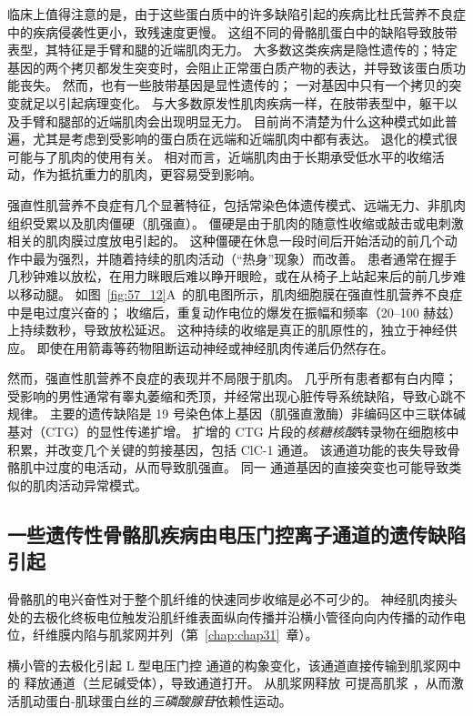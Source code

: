 临床上值得注意的是，由于这些蛋白质中的许多缺陷引起的疾病比杜氏营养不良症中的疾病侵袭性更小，致残速度更慢。
这组不同的骨骼肌蛋白中的缺陷导致肢带表型，其特征是手臂和腿的近端肌肉无力。
大多数这类疾病是隐性遗传的；特定基因的两个拷贝都发生突变时，会阻止正常蛋白质产物的表达，并导致该蛋白质功能丧失。
然而，也有一些肢带基因是显性遗传的；
一对基因中只有一个拷贝的突变就足以引起病理变化。
与大多数原发性肌肉疾病一样，在肢带表型中，躯干以及手臂和腿部的近端肌肉会出现明显无力。
目前尚不清楚为什么这种模式如此普遍，尤其是考虑到受影响的蛋白质在远端和近端肌肉中都有表达。
退化的模式很可能与了肌肉的使用有关。
相对而言，近端肌肉由于长期承受低水平的收缩活动，作为抵抗重力的肌肉，更容易受到影响。


强直性肌营养不良症有几个显著特征，包括常染色体遗传模式、远端无力、非肌肉组织受累以及肌肉僵硬（肌强直）。
僵硬是由于肌肉的随意性收缩或敲击或电刺激相关的肌肉膜过度放电引起的。
这种僵硬在休息一段时间后开始活动的前几个动作中最为强烈，并随着持续的肌肉活动（“热身”现象）而改善。
患者通常在握手几秒钟难以放松，在用力眯眼后难以睁开眼睑，或在从椅子上站起来后的前几步难以移动腿。
如图~\ref{fig:57_12}A~的肌电图所示，肌肉细胞膜在强直性肌营养不良症中是电过度兴奋的；
收缩后，重复动作电位的爆发在振幅和频率（20–100 赫兹）上持续数秒，导致放松延迟。
这种持续的收缩是真正的肌原性的，独立于神经供应。
即使在用箭毒等药物阻断运动神经或神经肌肉传递后仍然存在。


然而，强直性肌营养不良症的表现并不局限于肌肉。
几乎所有患者都有白内障；
受影响的男性通常有睾丸萎缩和秃顶，并经常出现心脏传导系统缺陷，导致心跳不规律。
主要的遗传缺陷是 19 号染色体上基因（肌强直激酶）非编码区中三联体碱基对（CTG）的显性传递扩增。
扩增的 CTG 片段的\textit{核糖核酸}转录物在细胞核中积累，并改变几个关键的剪接基因，包括 ClC-1  通道。
该通道功能的丧失导致骨骼肌中过度的电活动，从而导致肌强直。
同一  通道基因的直接突变也可能导致类似的肌肉活动异常模式。



\subsection{一些遗传性骨骼肌疾病由电压门控离子通道的遗传缺陷引起}

骨骼肌的电兴奋性对于整个肌纤维的快速同步收缩是必不可少的。
神经肌肉接头处的去极化终板电位触发沿肌纤维表面纵向传播并沿横小管径向向内传播的动作电位，纤维膜内陷与肌浆网并列（第~\ref{chap:chap31}~章）。


横小管的去极化引起 L 型电压门控  通道的构象变化，该通道直接传输到肌浆网中的  释放通道（兰尼碱受体），导致通道打开。
从肌浆网释放  可提高肌浆 ，从而激活肌动蛋白-肌球蛋白丝的\textit{三磷酸腺苷}依赖性运动。


